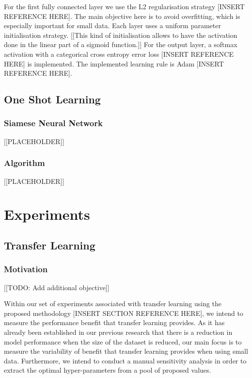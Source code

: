 \documentclass{article}
\begin{document}
For the first fully connected layer we use the L2 regularisation strategy [INSERT REFERENCE HERE]. The main objective here is to avoid overfitting, which is especially important for small data. Each layer uses a uniform parameter initialisation strategy. [[This kind of initialisation allows to have the activation done in the linear part of a sigmoid function.]] For the output layer, a softmax activation with a categorical cross entropy error loss [INSERT REFERENCE HERE] is implemented. The implemented learning rule is Adam [INSERT REFERENCE HERE].

\subsection{One Shot Learning}
\label{sec:oneshot}

\subsubsection{\textbf{Siamese Neural Network}}

[[PLACEHOLDER]]

\subsubsection{\textbf{Algorithm}}

[[PLACEHOLDER]]

\section{Experiments}
\label{sec:experiments}

\subsection{Transfer Learning}

\subsubsection{\textbf{Motivation}}

[[TODO: Add additional objective]]

Within our set of experiments associated with transfer learning using the proposed methodology [INSERT SECTION REFERENCE HERE], we intend to measure the performance benefit that transfer learning provides. As it has already been established in our previous research that there is a reduction in model performance when the size of the dataset is reduced, our main focus is to measure the variability of benefit that transfer learning provides when using small data. Furthermore, we intend to conduct a manual sensitivity analysis in order to extract the optimal hyper-parameters from a pool of proposed values.
\end{document}
